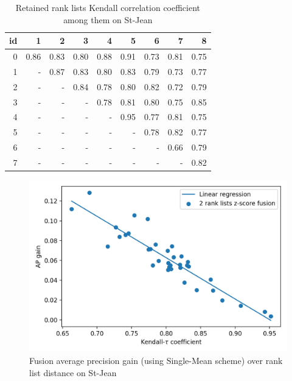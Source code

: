 \begin{table}
  \centering
  \caption{Retained rank lists Kendall correlation coefficient among them on St-Jean}
  \label{tab:rl_correlations}
  \begin{tabular}{r|r r r r r r r r}
    \toprule
    id &    1 &    2 &    3 &    4 &    5 &    6 &    7 &    8 \\
    \midrule
    0  & 0.86 & 0.83 & 0.80 & 0.88 & 0.91 & 0.73 & 0.81 & 0.75 \\
    1  &    - & 0.87 & 0.83 & 0.80 & 0.83 & 0.79 & 0.73 & 0.77 \\
    2  &    - &    - & 0.84 & 0.78 & 0.80 & 0.82 & 0.72 & 0.79 \\
    3  &    - &    - &    - & 0.78 & 0.81 & 0.80 & 0.75 & 0.85 \\
    4  &    - &    - &    - &    - & 0.95 & 0.77 & 0.81 & 0.75 \\
    5  &    - &    - &    - &    - &    - & 0.78 & 0.82 & 0.77 \\
    6  &    - &    - &    - &    - &    - &    - & 0.66 & 0.79 \\
    7  &    - &    - &    - &    - &    - &    - &    - & 0.82 \\
    \bottomrule
  \end{tabular}
\end{table}

\begin{figure}
  \centering
  \caption{Fusion average precision gain (using Single-Mean scheme) over rank list distance on St-Jean}
  \label{fig:rl_correlations}
  \includegraphics[width=\linewidth]{img/rank_list_correlation_mean_st_jean.png}
\end{figure}

